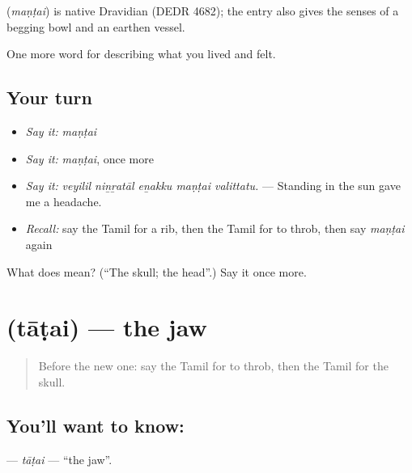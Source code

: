 \begin{cousinweb}
\textbf{} (\emph{maṇṭai}) is native Dravidian (DEDR 4682); the entry also gives the senses of a begging bowl and an earthen vessel.
\end{cousinweb}

\begin{grammarlens}[title={What you've built}]
One more word for describing what you lived and felt.
\end{grammarlens}

\subsection*{Your turn}
\begin{itemize}
\raggedright
  \item \emph{Say it:} \emph{maṇṭai}
  \item \emph{Say it:} \emph{maṇṭai}, once more
  \item \emph{Say it:} \emph{veyilil niṉṟatāl eṉakku maṇṭai valittatu.} — Standing in the sun gave me a headache.
  \item \emph{Recall:} say the Tamil for a rib, then the Tamil for to throb, then say \emph{maṇṭai} again
\end{itemize}

\begin{tcolorbox}[breakable,colback=teal!4,colframe=teal!35!black,title={Before you move on}]
What does  mean? (\textquotedblleft{}The skull; the head\textquotedblright{}.) Say it once more.
\end{tcolorbox}
\section[\texorpdfstring{\ta{தாடை} (tāṭai)}{தாடை (tāṭai)}]{ (tāṭai) — the jaw}

\label{lesson:TA-C480-tatai}



\begin{quote}
Before the new one: say the Tamil for to throb, then the Tamil for the skull.
\end{quote}

\subsection*{You'll want to know: }
\textbf{} — \emph{tāṭai} — \textquotedblleft{}the jaw\textquotedblright{}.

